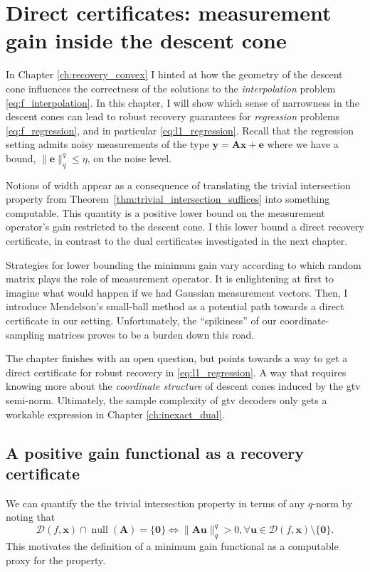 \chapter{Direct certificates: measurement gain inside the descent cone}
\label{ch:lower_bound_min_gain}

In Chapter \ref{ch:recovery_convex} I hinted at how the geometry of the descent cone influences the correctness of the solutions to the \emph{interpolation} problem \eqref{eq:f_interpolation}. In this chapter, I will show which sense of narrowness in the descent cones can lead to robust recovery guarantees for \emph{regression} problems \eqref{eq:f_regression}, and in particular \eqref{eq:l1_regression}. Recall that the regression setting admits noisy measurements of the type $\mathbf{y} = \mathbf{Ax} + \mathbf{e}$ where we have a bound, $\|\mathbf{e}\|_q^q \leq \eta$, on the noise level.

Notions of width appear as a consequence of translating the trivial intersection property from Theorem~\ref{thm:trivial_intersection_suffices} into something computable. This quantity is a positive lower bound on the measurement operator's gain restricted to the descent cone. I this lower bound a direct recovery certificate, in contrast to the dual certificates investigated in the next chapter.

Strategies for lower bounding the minimum gain vary according to which random matrix plays the role of measurement operator. It is enlightening at first to imagine what would happen if we had Gaussian measurement vectors. Then, I introduce Mendelson's small-ball method as a potential path towards a direct certificate in our setting. Unfortunately, the ``spikiness'' of our coordinate-sampling matrices proves to be a burden down this road.

The chapter finishes with an open question, but points towards a way to get a direct certificate for robust recovery in \eqref{eq:l1_regression}. A way that requires knowing more about the \emph{coordinate structure} of descent cones induced by the \acrshort{gtv} semi-norm. Ultimately, the sample complexity of \acrshort{gtv} decoders only gets a workable expression in Chapter \ref{ch:inexact_dual}.


\section{A positive gain functional as a recovery certificate}

We can quantify the the trivial intersection property in terms of any $q$-norm by noting that
\begin{equation}
    \mathcal{D}(f, \mathbf{x}) \cap \operatorname{null} \left ( \mathbf{A} \right ) = \{ \mathbf{0} \} \iff \|\mathbf{Au}\|_q^q > 0, \forall \mathbf{u} \in \mathcal{D}(f, \mathbf{x}) \setminus \{ \mathbf{0} \}.
    \label{eq:trivial_intersect_equiv_lower_bound_gain}
\end{equation}
This motivates the definition of a minimum gain functional as a computable proxy for the property.

